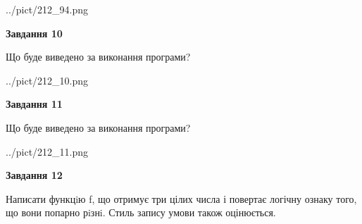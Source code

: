 \documentclass[12pt, ukrainian]{article}
\begin{document}
{\begin {large}
\begin{center}
	{../pict/212_94.png}
\end{center}
\newpage

{\begin {center}\textbf{Завдання 10}\end {center}}

Що буде виведено за виконання програми?\par
\begin{center}
	{../pict/212_10.png}
\end{center}
\newpage

{\begin {center}\textbf{Завдання 11}\end {center}}

Що буде виведено за виконання програми?\par
\begin{center}
	{../pict/212_11.png}
\end{center}
\newpage

{\begin {center}\textbf{Завдання 12}\end {center}}


Написати функцiю f, що отримує три цілих числа і повертає логічну ознаку того, що вони попарно рiзнi. Стиль запису умови також оцінюється.\par
\newpage

\end {large}}
\end{document}
